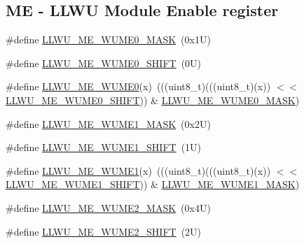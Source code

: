 \subsection*{ME -\/ L\+L\+WU Module Enable register}
\begin{DoxyCompactItemize}
\item 
\#define \mbox{\hyperlink{group___l_l_w_u___register___masks_ga5f1588218d510ac13093055708ceae49}{L\+L\+W\+U\+\_\+\+M\+E\+\_\+\+W\+U\+M\+E0\+\_\+\+M\+A\+SK}}~(0x1\+U)
\item 
\#define \mbox{\hyperlink{group___l_l_w_u___register___masks_ga7f653f4ce89c4512437c0114f4659502}{L\+L\+W\+U\+\_\+\+M\+E\+\_\+\+W\+U\+M\+E0\+\_\+\+S\+H\+I\+FT}}~(0\+U)
\item 
\#define \mbox{\hyperlink{group___l_l_w_u___register___masks_ga57e76f009f14fc197aa6bf7ce0e56f22}{L\+L\+W\+U\+\_\+\+M\+E\+\_\+\+W\+U\+M\+E0}}(x)~(((uint8\+\_\+t)(((uint8\+\_\+t)(x)) $<$$<$ \mbox{\hyperlink{group___l_l_w_u___register___masks_ga7f653f4ce89c4512437c0114f4659502}{L\+L\+W\+U\+\_\+\+M\+E\+\_\+\+W\+U\+M\+E0\+\_\+\+S\+H\+I\+FT}})) \& \mbox{\hyperlink{group___l_l_w_u___register___masks_ga5f1588218d510ac13093055708ceae49}{L\+L\+W\+U\+\_\+\+M\+E\+\_\+\+W\+U\+M\+E0\+\_\+\+M\+A\+SK}})
\item 
\#define \mbox{\hyperlink{group___l_l_w_u___register___masks_ga99b29643134140d21a3d4259b7f64c86}{L\+L\+W\+U\+\_\+\+M\+E\+\_\+\+W\+U\+M\+E1\+\_\+\+M\+A\+SK}}~(0x2\+U)
\item 
\#define \mbox{\hyperlink{group___l_l_w_u___register___masks_gac623d0db3076972370ee795830b555c1}{L\+L\+W\+U\+\_\+\+M\+E\+\_\+\+W\+U\+M\+E1\+\_\+\+S\+H\+I\+FT}}~(1\+U)
\item 
\#define \mbox{\hyperlink{group___l_l_w_u___register___masks_ga7537345eb6a634652141bd92b6e1c029}{L\+L\+W\+U\+\_\+\+M\+E\+\_\+\+W\+U\+M\+E1}}(x)~(((uint8\+\_\+t)(((uint8\+\_\+t)(x)) $<$$<$ \mbox{\hyperlink{group___l_l_w_u___register___masks_gac623d0db3076972370ee795830b555c1}{L\+L\+W\+U\+\_\+\+M\+E\+\_\+\+W\+U\+M\+E1\+\_\+\+S\+H\+I\+FT}})) \& \mbox{\hyperlink{group___l_l_w_u___register___masks_ga99b29643134140d21a3d4259b7f64c86}{L\+L\+W\+U\+\_\+\+M\+E\+\_\+\+W\+U\+M\+E1\+\_\+\+M\+A\+SK}})
\item 
\#define \mbox{\hyperlink{group___l_l_w_u___register___masks_ga9f19f501dd2ad4aa2f7b01ac8edf8056}{L\+L\+W\+U\+\_\+\+M\+E\+\_\+\+W\+U\+M\+E2\+\_\+\+M\+A\+SK}}~(0x4\+U)
\item 
\#define \mbox{\hyperlink{group___l_l_w_u___register___masks_ga383c567df0dbc9edf2773d29676a7b30}{L\+L\+W\+U\+\_\+\+M\+E\+\_\+\+W\+U\+M\+E2\+\_\+\+S\+H\+I\+FT}}~(2\+U)

\end{DoxyCompactItemize}
